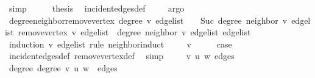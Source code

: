 \begin{isabellebody}
\ simp\isanewline
\ \ \isamarkupfalse%
\ \isamarkupfalse%
\ {\isacharquery}{\kern0pt}thesis\ \isamarkupfalse%
\ incident{\isacharunderscore}{\kern0pt}edges{\isacharunderscore}{\kern0pt}def\ \isamarkupfalse%
\ {}\ \isamarkupfalse%
\ argo\isanewline
{}\isamarkupfalse%
%
\endisatagproof
{\isafoldproof}%
%
\isadelimproof
\isanewline
%
\endisadelimproof
\isanewline
{}\isamarkupfalse%
\ degree{\isacharunderscore}{\kern0pt}neighbor{\isacharunderscore}{\kern0pt}remove{\isacharunderscore}{\kern0pt}vertex{\isacharcolon}{\kern0pt}\ {\isachardoublequoteopen}degree\ v\ edge{\isacharunderscore}{\kern0pt}list\ {\isacharequal}{\kern0pt}\ {}\ {\isasymLongrightarrow}\ Suc\ {\isacharparenleft}{\kern0pt}degree\ {\isacharparenleft}{\kern0pt}neighbor\ v\ edge{\isacharunderscore}{\kern0pt}list{\isacharparenright}{\kern0pt}\ {\isacharparenleft}{\kern0pt}remove{\isacharunderscore}{\kern0pt}vertex\ v\ edge{\isacharunderscore}{\kern0pt}list{\isacharparenright}{\kern0pt}{\isacharparenright}{\kern0pt}\ {\isacharequal}{\kern0pt}\ degree\ {\isacharparenleft}{\kern0pt}neighbor\ v\ edge{\isacharunderscore}{\kern0pt}list{\isacharparenright}{\kern0pt}\ edge{\isacharunderscore}{\kern0pt}list{\isachardoublequoteclose}\isanewline
%
\isadelimproof
%
\endisadelimproof
%
\isatagproof
{}\isamarkupfalse%
\ {\isacharparenleft}{\kern0pt}induction\ v\ edge{\isacharunderscore}{\kern0pt}list\ rule{\isacharcolon}{\kern0pt}\ neighbor{\isachardot}{\kern0pt}induct{\isacharparenright}{\kern0pt}\isanewline
\ \ \isamarkupfalse%
\ {\isacharparenleft}{\kern0pt}{}\ v{\isacharparenright}{\kern0pt}\isanewline
\ \ \isamarkupfalse%
\ \isamarkupfalse%
\ {\isacharquery}{\kern0pt}case\ \isamarkupfalse%
\ incident{\isacharunderscore}{\kern0pt}edges{\isacharunderscore}{\kern0pt}def\ remove{\isacharunderscore}{\kern0pt}vertex{\isacharunderscore}{\kern0pt}def\ \isamarkupfalse%
\ simp\isanewline
{}\isamarkupfalse%
\isanewline
\ \ \isamarkupfalse%
\ {\isacharparenleft}{\kern0pt}{}\ v\ u\ w\ edges{\isacharparenright}{\kern0pt}\isanewline
\ \ \isamarkupfalse%
\ degree{\isacharunderscore}{\kern0pt}{}{\isacharcolon}{\kern0pt}\ {\isachardoublequoteopen}degree\ v\ {\isacharparenleft}{\kern0pt}{\isacharparenleft}{\kern0pt}u{\isacharcomma}{\kern0pt}\ w{\isacharparenright}{\kern0pt}\ {\isacharhash}{\kern0pt}\ edges{\isacharparenright}{\kern0pt}\ {\isacharequal}{\kern0pt}\ {}{\isachardoublequoteclose}\isanewline

\end{isabellebody}
